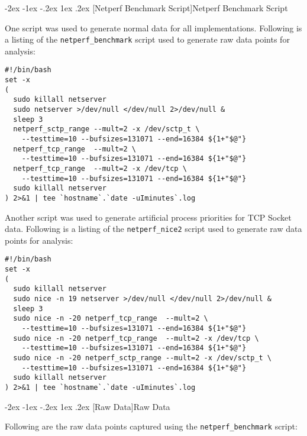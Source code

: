 \documentclass[letterpaper,final,notitlepage,twocolumn,10pt,twoside]{article}
\makeatletter
\renewcommand\section{\@startsection {section}{1}{\z@}%
                                   {-2ex \@plus -1ex \@minus -.2ex}%
                                   {1ex \@plus .2ex}%
                                   {\normalfont\large\bfseries}}
\makeatother
\begin{document}
\clearpage
\begin{appendix}

\section[Netperf Benchmark Script]{Netperf Benchmark Script}
\label{section:script}

One script was used to generate normal data for all implementations.
Following is a listing of the \texttt{netperf\_benchmark} script used to generate raw data points
for analysis:

\footnotesize
\begin{verbatim}
#!/bin/bash
set -x
(
  sudo killall netserver
  sudo netserver >/dev/null </dev/null 2>/dev/null &
  sleep 3
  netperf_sctp_range --mult=2 -x /dev/sctp_t \
    --testtime=10 --bufsizes=131071 --end=16384 ${1+"$@"}
  netperf_tcp_range  --mult=2 \
    --testtime=10 --bufsizes=131071 --end=16384 ${1+"$@"}
  netperf_tcp_range  --mult=2 -x /dev/tcp \
    --testtime=10 --bufsizes=131071 --end=16384 ${1+"$@"}
  sudo killall netserver
) 2>&1 | tee `hostname`.`date -uIminutes`.log
\end{verbatim}
\normalsize

Another script was used to generate artificial process priorities for TCP Socket data.
Following is a listing of the \texttt{netperf\_nice2} script used to generate raw data points for
analysis:

\footnotesize
\begin{verbatim}
#!/bin/bash
set -x
(
  sudo killall netserver
  sudo nice -n 19 netserver >/dev/null </dev/null 2>/dev/null &
  sleep 3
  sudo nice -n -20 netperf_tcp_range  --mult=2 \
    --testtime=10 --bufsizes=131071 --end=16384 ${1+"$@"}
  sudo nice -n -20 netperf_tcp_range  --mult=2 -x /dev/tcp \
    --testtime=10 --bufsizes=131071 --end=16384 ${1+"$@"}
  sudo nice -n -20 netperf_sctp_range --mult=2 -x /dev/sctp_t \
    --testtime=10 --bufsizes=131071 --end=16384 ${1+"$@"}
  sudo killall netserver
) 2>&1 | tee `hostname`.`date -uIminutes`.log
\end{verbatim}
\normalsize

\section[Raw Data]{Raw Data}
\label{section:rawdata}

Following are the raw data points captured using the \texttt{netperf\_benchmark} script:


\end{appendix}
\end{document}
